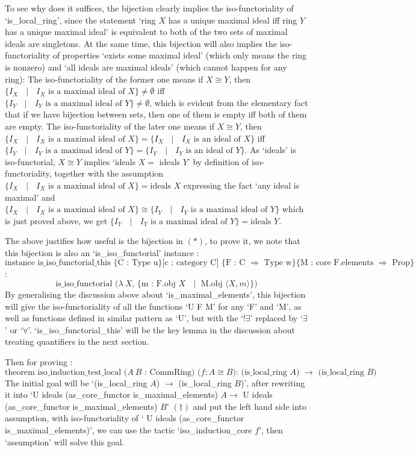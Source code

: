 \documentclass[11pt]{article}
\begin{document}
To see why does it suffices, the bijection clearly implies the iso-functoriality of `is\_local\_ring', since the statement `ring $X$ has a unique maximal ideal iff ring $Y$ has a unique maximal ideal' is equivalent to both of the two sets of maximal ideals are singletons. At the same time, this bijection will also implies the iso-functoriality of properties `exists some maximal ideal' (which only means the ring is nonzero) and `all ideals are maximal ideals' (which cannot happen for any ring): The iso-functoriality of the former one means if $X\cong Y$, then $\text{\{$I_X$ $\mid$ $I_X$ is a maximal ideal of $X$\}}\ne \emptyset$ iff $\text{\{$I_Y$ $\mid$ $I_Y$ is a maximal ideal of $Y$\}}\ne \emptyset$, which is evident from the elementary fact that if we have bijection between sets, then one of them is empty iff both of them are empty. The iso-functoriality of the later one means if $X\cong Y$, then $\text{\{$I_X$ $\mid$ $I_X$ is a maximal ideal of $X$\}}= \text{\{$I_X$ $\mid$ $I_X$ is an ideal of $X$\}}$ iff $\text{\{$I_Y$ $\mid$ $I_Y$ is a maximal ideal of $Y$\}}= \text{\{$I_Y$ $\mid$ $I_Y$ is an ideal of $Y$\}}$. As `ideals' is iso-functorial, $X\cong Y$ implies `ideals $X =$ ideals $Y$' by definition of iso-functoriality, together with the assumption \newline $\text{\{$I_X$ $\mid$ $I_X$ is a maximal ideal of $X$\}}= \text{ideals $X$}$ expressing the fact `any ideal is maximal' and $\text{\{$I_X$ $\mid$ $I_X$ is a maximal ideal of $X$\}} \cong \text{\{$I_Y$ $\mid$ $I_Y$ is a maximal ideal of $Y$\}}$ which is just proved above, we get $\text{\{$I_Y$ $\mid$ $I_Y$ is a maximal ideal of $Y$\}}= \text{ideals $Y$}$.

The above justifies how useful is the bijection in $(*)$, to prove it, we note that this bijection is also an `is\_iso\_functorial' instance :
\[\text{instance is\_iso\_functorial\_this 
\{C : Type u\} [c : category C] \{F : C $\Rightarrow$ Type w\} \{M : core F.elements $\Rightarrow$ Prop\}}\]:
\[\text{is\_iso\_functorial 
($\lambda \ X$, \{m : F.obj $X$ $\mid$ M.obj $\langle X, m \rangle$\})}\]
By generalising the discussion above about `is\_maximal\_elements', this bijection will give the iso-functoriality of all the functions `U F M' for any `F' and `M', as well as functions defined in similar pattern as `U', but with the `$!\exists$' replaced by `$\exists$' or `$\forall$'. `is\_iso\_functorial\_this' will be the key lemma in the discussion about treating quantifiers in the next section.

Then for proving :
\[\text{
   theorem iso\_induction\_test\_local ($A \ B$ : CommRing) ($f : A \cong B$): (is\_local\_ring $A$) $\to$ (is\_local\_ring $B$)
      }\]
The initial goal will be `(is\_local\_ring $A$) $\to$ (is\_local\_ring $B$)', after rewriting it into `U ideals (as\_core\_functor is\_maximal\_elements) $A \to$ U ideals (as\_core\_functor is\_maximal\_elements) $B$' $(\dagger)$ and put the left hand side into assumption, with iso-functoriality of ` U ideals (as\_core\_functor is\_maximal\_elements)', we can use the tactic `iso\_induction\_core $f$', then `assumption' will solve this goal. 
\end{document}
